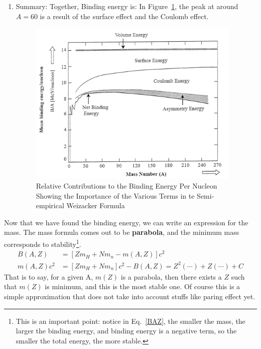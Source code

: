 \documentclass{school-22.101-notes}
\begin{document}
\begin{enumerate}
    \item Summary: Together, Binding energy is:
    In Figure~\ref{binding-effect}, the peak at around $A = 60$ is a result of the surface effect and the Coulomb effect. 
    \begin{figure}
        \centering
        \includegraphics[width=4in]{images/rd/binding-effect.png}
        \caption{Relative Contributions to the Binding Energy Per Nucleon Showing the Importance of the Various Terms in te Semi-empirical Weizacker Formula \label{binding-effect}}
    \end{figure}
\end{enumerate}


Now that we have found the binding energy, we can write an expression for the mass. The mass formula comes out to be \textbf{parabola}, and the minimum mass corresponds to stability\footnote{This is an important point: notice in Eq.~\ref{BAZ}, the smaller the mass, the larger the binding energy, and binding energy is a negative term, so the smaller the total energy, the more stable. }.
\begin{align}
B(A,Z) &= \left[ Z m_H + N m_n - m(A,Z) \right] c^2  \label{BAZ}\\
m(A,Z) c^2 &= \left[ Z m_H + N m_n \right] c^2 - B(A,Z) = Z^2 (\cdots) + Z(\cdots) + C 
\end{align}
That is to say, for a given A, $m(Z)$ is a parabola, then there exists a $Z$ such that $m(Z)$ is minimum, and this is the most stable one. Of course this is a simple approximation that does not take into account stuffs like paring effect yet. 
\end{document}
